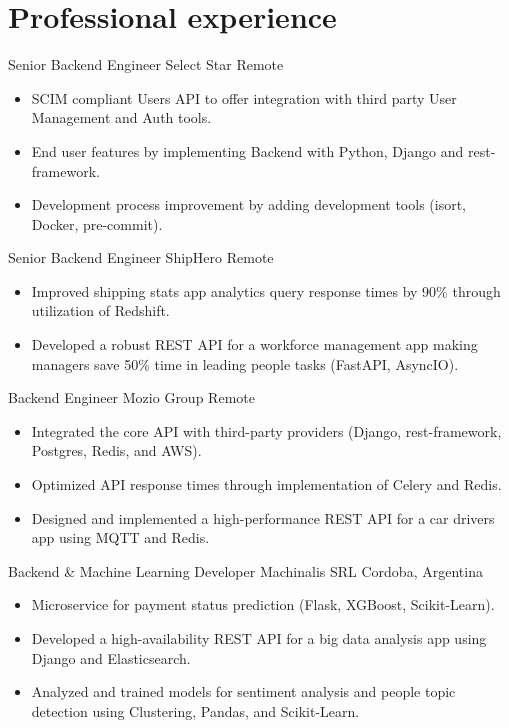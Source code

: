 
\section{Professional experience}
    {Senior Backend Engineer} %
    {Select Star} %
    {Remote} %
    {}
    {
      \begin{itemize} %
        \item {SCIM compliant Users API to offer integration with third party User Management and Auth tools.}
        \item {End user features by implementing Backend with Python, Django and rest-framework.}
        \item {Development process improvement by adding development tools (isort, Docker, pre-commit).}
      \end{itemize}
    }
    {Senior Backend Engineer} %
    {ShipHero} %
    {Remote} %
    {}
    {
      \begin{itemize} %
        \item {Improved shipping stats app analytics query response times by 90\% through utilization of Redshift.}
        \item {Developed a robust REST API for a workforce management app making managers save 50\% time in leading people tasks (FastAPI, AsyncIO).}
      \end{itemize}
    }
    {Backend Engineer} %
    {Mozio Group} %
    {Remote} %
    {}
    {
      \begin{itemize} %
        \item {Integrated the core API with third-party providers (Django, rest-framework, Postgres, Redis, and AWS).}
        \item {Optimized API response times through implementation of Celery and Redis.}
        \item {Designed and implemented a high-performance REST API for a car drivers app using MQTT and Redis.}
      \end{itemize}
    }
    {Backend \& Machine Learning Developer} %
    {Machinalis SRL} %
    {Cordoba, Argentina} %
    {}
    {
      \begin{itemize} %
        \item {Microservice for payment status prediction (Flask, XGBoost, Scikit-Learn).}
        \item {Developed a high-availability REST API for a big data analysis app using Django and Elasticsearch.}
        \item {Analyzed and trained models for sentiment analysis and people topic detection using Clustering, Pandas, and Scikit-Learn.}
      \end{itemize}
    }

